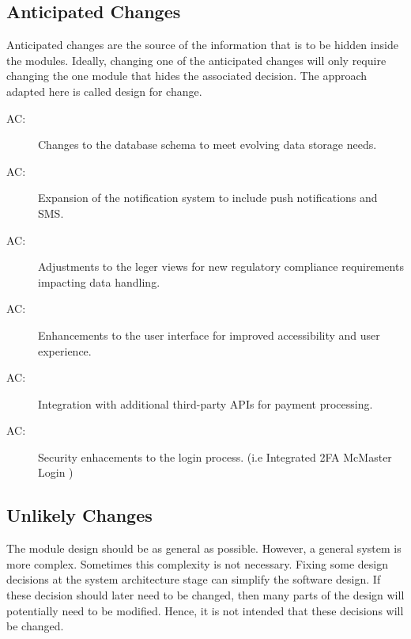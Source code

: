 \documentclass[12pt, titlepage]{article}
\newcounter{acnum}
\newcommand{\actheacnum}{AC\theacnum}
\begin{document}
\subsection{Anticipated Changes} \label{SecAchange}

Anticipated changes are the source of the information that is to be hidden
inside the modules. Ideally, changing one of the anticipated changes will only
require changing the one module that hides the associated decision. The approach
adapted here is called design for
change.

\begin{description}
\item[ \actheacnum \label{acDataSchema}:] Changes to the database schema to meet evolving data storage needs.
\item[ \actheacnum \label{acNotifications}:] Expansion of the notification system to include push notifications and SMS.
\item[ \actheacnum \label{acCompliance}:] Adjustments to the leger views for new regulatory compliance requirements impacting data handling.
\item[ \actheacnum \label{acUI}:] Enhancements to the user interface for improved accessibility and user experience.
\item[ \actheacnum \label{acIntegration}:] Integration with additional third-party APIs for payment processing.
\item[ \actheacnum \label{acLogin}:] Security enhacements to the login process. (i.e Integrated 2FA McMaster Login )
\end{description}


\subsection{Unlikely Changes} \label{SecUchange}

The module design should be as general as possible. However, a general system is
more complex. Sometimes this complexity is not necessary. Fixing some design
decisions at the system architecture stage can simplify the software design. If
these decision should later need to be changed, then many parts of the design
will potentially need to be modified. Hence, it is not intended that these
decisions will be changed.
\end{document}
